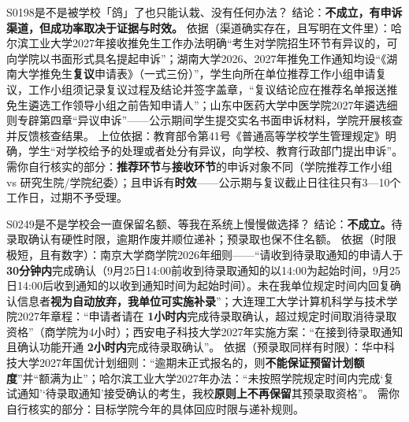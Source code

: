\begin{qa}{S0198}{是不是被学校「鸽」了也只能认栽、没有任何办法？}
结论：\textbf{不成立，有申诉渠道，但成功率取决于证据与时效。}
依据（渠道确实存在，且写明在文件里）：哈尔滨工业大学2027年接收推免生工作办法明确“考生对学院招生环节有异议的，可向学院以书面形式具名提起申诉”；湖南大学2026、2027年推免工作通知均设“《湖南大学推免生\textbf{复议}申请表》（一式三份）”，学生向所在单位推荐工作小组申请复议，工作小组须记录复议过程及结论并签字盖章，“复议结论应在推荐名单报送推免生遴选工作领导小组之前告知申请人”；山东中医药大学中医学院2027年遴选细则专辟第四章“异议申诉”——公示期间学生提交实名书面申诉材料，学院开展核查并反馈核查结果。
上位依据：教育部令第41号《普通高等学校学生管理规定》明确，学生“对学校给予的处理或者处分有异议，向学校、教育行政部门提出申诉”。
需你自行核实的部分：\textbf{推荐环节}与\textbf{接收环节}的申诉对象不同（学院推荐工作小组 vs 研究生院/学院纪委）；且申诉有\textbf{时效}——公示期与复议截止日往往只有3—10个工作日，过期不予受理。
\end{qa}

\begin{qa}{S0249}{是不是学校会一直保留名额、等我在系统上慢慢做选择？}
结论：\textbf{不成立。}待录取确认有硬性时限，逾期作废并顺位递补；预录取也保不住名额。
依据（时限极短，且有数字）：南京大学商学院2026年细则——“请收到待录取通知的申请人于 \textbf{30分钟内}完成确认（9月25日14:00前收到待录取通知的以14:00为起始时间，9月25日14:00后收到通知的以收到通知时间为起始时间）。未在我单位规定时间内回复确认信息者\textbf{视为自动放弃，我单位可实施补录}”；大连理工大学计算机科学与技术学院2027年章程：“申请者请在 \textbf{1小时内}完成待录取确认，超过规定时间取消待录取资格”（商学院为4小时）；西安电子科技大学2027年实施方案：“在接到待录取通知且确认功能开通 \textbf{2小时内}完成待录取确认”。
依据（预录取同样有时限）：华中科技大学2027年国优计划细则：“逾期未正式报名的，则\textbf{不能保证预留计划额度}”并“额满为止”；哈尔滨工业大学2027年办法：“未按照学院规定时间内完成‘复试通知’‘待录取通知’接受确认的考生，我校\textbf{原则上不再保留}其预录取资格”。
需你自行核实的部分：目标学院今年的具体回应时限与递补规则。
\end{qa}

